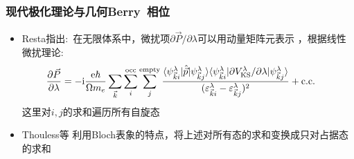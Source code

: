 \frame
{
	\frametitle{现代极化理论与几何\textrm{Berry~}相位}
	\begin{itemize}
		\item \textrm{Resta}指出:~在无限体系中，微扰项$\partial\vec P/\partial\lambda$可以用动量矩阵元表示%
，根据线性微扰理论:
	\begin{displaymath}
		\hspace*{-15pt}
		\frac{\partial\vec P}{\partial\lambda}=-\mathrm{i}\frac{\mathrm{e}\hbar}{\Omega m_e}\sum_{\vec k}\sum_i^{\mathrm{occ}}\sum_j^{\mathrm{empty}}\frac{\langle\psi_{\vec k i}^{\lambda}|\hat{\vec p}|\psi_{\vec k j}^{\lambda}\rangle\langle\psi_{\vec k i}^{\lambda}|\partial V_{\mathrm{KS}}^{\lambda}/\partial\lambda|\psi_{\vec k j}^{\lambda}\rangle}{(\varepsilon_{\vec k i}^{\lambda}-\varepsilon_{\vec k j}^{\lambda})^2}+\mathrm{c.c.}
	\end{displaymath}
	这里对$i,j$的求和遍历所有自旋态
	\vskip 5pt 
	\item \textrm{Thouless}等%
		利用\textrm{Bloch}表象的特点，将上述对所有态的求和变换成只对占据态的求和%
	\vskip 3pt 
	{\fontsize{8.0pt}{6.2pt}}
	\end{itemize}
}

